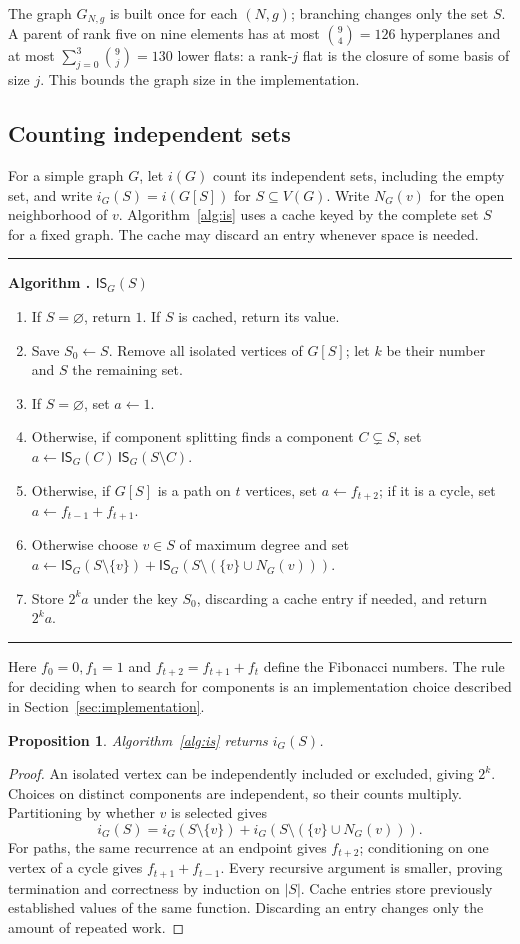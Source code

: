\documentclass[11pt]{article}
\newtheorem{proposition}[theorem]{Proposition}
\theoremstyle{definition}
\newcounter{algorithm}
\newenvironment{algorithm}[1]{%
  \refstepcounter{algorithm}\par\medskip\noindent
  \begin{minipage}{\linewidth}\hrule\medskip
  \textbf{Algorithm \thealgorithm. #1}\par\smallskip
  \begin{enumerate}[label=\arabic*.,leftmargin=2.2em,itemsep=2pt,topsep=0pt]
}{\end{enumerate}\medskip\hrule\end{minipage}\par\medskip}
\newcommand{\IS}{\mathsf{IS}}
\begin{document}
The graph $G_{N,g}$ is built once for each $(N,g)$; branching changes only
the set $S$. A parent of rank five on nine elements has at
most $\binom94=126$ hyperplanes and at most
$\sum_{j=0}^3\binom9j=130$ lower flats: a rank-$j$ flat is the closure of
some basis of size $j$. This bounds the graph size in the implementation.

\subsection{Counting independent sets}

For a simple graph $G$, let $i(G)$ count its independent sets, including
the empty set, and write $i_G(S)=i(G[S])$ for $S\subseteq V(G)$.
Write $N_G(v)$ for the open neighborhood of $v$.
Algorithm~\ref{alg:is} uses a cache keyed by the complete set $S$ for a
fixed graph. The cache may discard an entry whenever space is needed.

\begin{algorithm}{$\IS_G(S)$}\label{alg:is}
\item If $S=\varnothing$, return $1$. If $S$ is cached, return its value.
\item Save $S_0\gets S$. Remove all isolated vertices of $G[S]$;
      let $k$ be their number and $S$ the remaining set.
\item If $S=\varnothing$, set $a\gets 1$.
\item Otherwise, if component splitting finds a component $C\subsetneq S$,
      set $a\gets\IS_G(C)\,\IS_G(S\setminus C)$.
\item Otherwise, if $G[S]$ is a path on $t$ vertices, set $a\gets f_{t+2}$;
      if it is a cycle, set $a\gets f_{t-1}+f_{t+1}$.
\item Otherwise choose $v\in S$ of maximum degree and set
      $a\gets\IS_G(S\setminus\{v\})+
      \IS_G(S\setminus(\{v\}\cup N_G(v)))$.
\item Store $2^k a$ under the key $S_0$, discarding a cache entry if needed,
      and return $2^k a$.
\end{algorithm}

Here $f_0=0,f_1=1$ and $f_{t+2}=f_{t+1}+f_t$ define the Fibonacci numbers.
The rule for deciding when to search for components is an implementation
choice described in Section~\ref{sec:implementation}.

\begin{proposition}\label{prop:is}
Algorithm~\ref{alg:is} returns $i_G(S)$.
\end{proposition}
\begin{proof}
An isolated vertex can be independently included or excluded, giving $2^k$.
Choices on distinct components are independent, so their counts multiply.
Partitioning by whether $v$ is selected gives
\[
i_G(S)=i_G(S\setminus\{v\})+
i_G(S\setminus(\{v\}\cup N_G(v))).
\]
For paths, the same recurrence at an endpoint gives $f_{t+2}$; conditioning
on one vertex of a cycle gives $f_{t+1}+f_{t-1}$. Every recursive argument
is smaller, proving termination and correctness by induction on $|S|$.
Cache entries store previously established values of the same function.
Discarding an entry changes only the amount of repeated work.
\end{proof}
\end{document}
